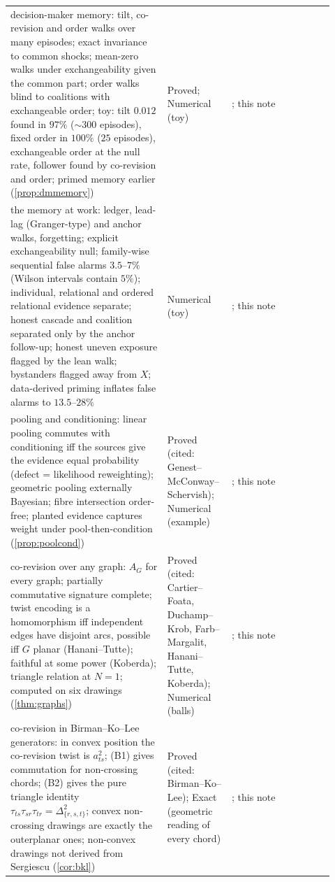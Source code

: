 \documentclass[11pt]{article}
\theoremstyle{definition}\newtheorem{definition}[theorem]{Definition}\newtheorem{remark}[theorem]{Remark}\newtheorem{example}[theorem]{Example}\newtheorem{problem}[theorem]{Open problem}\crefname{problem}{Problem}{Problems}
\begin{document}
{\begin{longtable}{p{0.46\linewidth}p{0.16\linewidth}p{0.3\linewidth}}
\rowcolor{stNew} decision-maker memory: tilt, co-revision and order walks over many episodes; exact invariance to common shocks; mean-zero walks under exchangeability given the common part; order walks blind to coalitions with exchangeable order; toy: tilt $0.012$ found in $97\%$ ($\sim300$ episodes), fixed order in $100\%$ ($25$ episodes), exchangeable order at the null rate, follower found by co-revision and order; primed memory earlier (\cref{prop:dmmemory}) & Proved; Numerical (toy) & \cite{GohmKostler2009,Nechaev1998}; this note\\
\rowcolor{stNew} the memory at work: ledger, lead-lag (Granger-type) and anchor walks, forgetting; explicit exchangeability null; family-wise sequential false alarms $3.5$--$7\%$ (Wilson intervals contain $5\%$); individual, relational and ordered relational evidence separate; honest cascade and coalition separated only by the anchor follow-up; honest uneven exposure flagged by the lean walk; bystanders flagged away from $X$; data-derived priming inflates false alarms to $13.5$--$28\%$ & Numerical (toy) & \cite{Granger1969,Wilson1927}; this note\\
\rowcolor{stNew} pooling and conditioning: linear pooling commutes with conditioning iff the sources give the evidence equal probability (defect = likelihood reweighting); geometric pooling externally Bayesian; fibre intersection order-free; planted evidence captures weight under pool-then-condition (\cref{prop:poolcond}) & Proved (cited: Genest--McConway--Schervish); Numerical (example) & \cite{Stone1961,GenestZidek1986,GenestMcConwaySchervish1986}; this note\\
\rowcolor{stNew} co-revision over any graph: $A_G$ for every graph; partially commutative signature complete; twist encoding is a homomorphism iff independent edges have disjoint arcs, possible iff $G$ planar (Hanani--Tutte); faithful at some power (Koberda); triangle relation at $N=1$; computed on six drawings (\cref{thm:graphs}) & Proved (cited: Cartier--Foata, Duchamp--Krob, Farb--Margalit, Hanani--Tutte, Koberda); Numerical (balls) & \cite{Tutte1970,PelsmajerSchaeferStefankovic2007,FarbMargalit2012,Koberda2012,CrispParis2001}; this note\\
\rowcolor{stNew} co-revision in Birman--Ko--Lee generators: in convex position the co-revision twist is $a_{ts}^2$; (B1) gives commutation for non-crossing chords; (B2) gives the pure triangle identity $\tau_{ts}\tau_{sr}\tau_{tr}=\Delta^2_{\{r,s,t\}}$; convex non-crossing drawings are exactly the outerplanar ones; non-convex drawings not derived from Sergiescu (\cref{cor:bkl}) & Proved (cited: Birman--Ko--Lee); Exact (geometric reading of every chord) & \cite{BirmanKoLee1998,Sergiescu1993}; this note\\

\end{longtable}}
\end{document}

